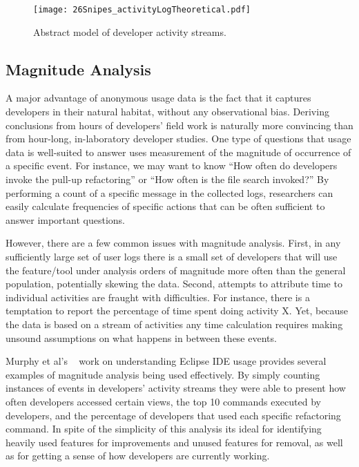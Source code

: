 \begin{figure*}[t]
 \centering
\texttt{[image: 26Snipes\_activityLogTheoretical.pdf]}
\caption{Abstract model of developer activity streams.}
\label{fig:theoretical}
\end{figure*}



\subsection{Magnitude Analysis}

A major advantage of anonymous usage data is the fact that it captures developers in their natural habitat, without any observational bias. Deriving conclusions from hours of developers' field work is naturally more convincing than from hour-long, in-laboratory developer studies. One type of questions that usage data is well-suited to answer uses measurement of the magnitude of occurrence of a specific event. For instance, we may want to know ``How often do developers invoke the pull-up refactoring'' or ``How often is the file search invoked?'' By performing a count of a specific message in the collected logs, researchers can easily calculate frequencies of specific actions that can be often sufficient to answer important questions. 

However, there are a few common issues with magnitude analysis. First, in any sufficiently large set of user logs there is a small set of developers that will use the feature/tool under analysis orders of magnitude more often than the general population, potentially skewing the data. 
Second, attempts to attribute time to individual activities are fraught with difficulties. For instance, there is a temptation to report the percentage of time spent doing activity X. Yet, because the data is based on a stream of activities any time calculation requires making unsound assumptions on what happens in between these events.

Murphy et al's ~\citeyear{V:Murphy2006How} work on understanding Eclipse IDE usage provides several examples of magnitude analysis being used effectively. By simply counting instances of events in developers' activity streams they were able to present how often developers accessed certain views, the top 10 commands executed by developers, and the percentage of developers that used each specific refactoring command. In spite of the simplicity of this analysis its ideal for identifying heavily used features for improvements and unused features for removal, as well as for getting a sense of how developers are currently working. 

